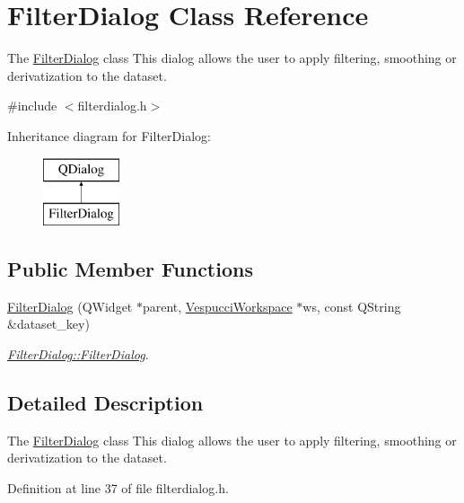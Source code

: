 \hypertarget{class_filter_dialog}{}\section{Filter\+Dialog Class Reference}
\label{class_filter_dialog}


The \hyperlink{class_filter_dialog}{Filter\+Dialog} class This dialog allows the user to apply filtering, smoothing or derivatization to the dataset.  




{\ttfamily \#include $<$filterdialog.\+h$>$}

Inheritance diagram for Filter\+Dialog\+:\begin{figure}[H]
\begin{center}
\leavevmode
\includegraphics[height=2.000000cm]{class_filter_dialog}
\end{center}
\end{figure}
\subsection*{Public Member Functions}
\begin{DoxyCompactItemize}
\item 
\hyperlink{class_filter_dialog_a62e2170f1487851d7aba6a0f63820bae}{Filter\+Dialog} (Q\+Widget $\ast$parent, \hyperlink{class_vespucci_workspace}{Vespucci\+Workspace} $\ast$ws, const Q\+String \&dataset\+\_\+key)
\begin{DoxyCompactList}\small\item\em \hyperlink{class_filter_dialog_a62e2170f1487851d7aba6a0f63820bae}{Filter\+Dialog\+::\+Filter\+Dialog}. \end{DoxyCompactList}\end{DoxyCompactItemize}


\subsection{Detailed Description}
The \hyperlink{class_filter_dialog}{Filter\+Dialog} class This dialog allows the user to apply filtering, smoothing or derivatization to the dataset. 

Definition at line 37 of file filterdialog.\+h.



